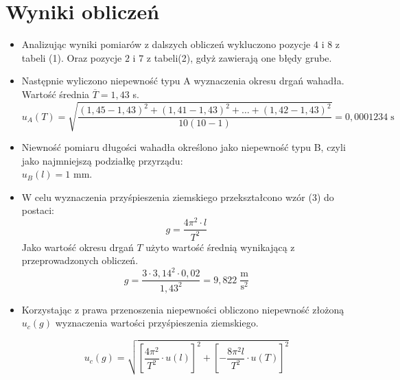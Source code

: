 \documentclass{article}
\theoremstyle{plain}
\begin{document}

\section{Wyniki obliczeń}
	\begin{itemize}
		\item Analizując wyniki pomiarów z dalszych obliczeń wykluczono pozycje $4$ i $8$ z tabeli (1). Oraz pozycje $2$ i $7$ z tabeli(2), gdyż zawierają one błędy grube. %
		
		\item Następnie wyliczono niepewność typu A wyznaczenia okresu drgań wahadła.\\
			Wartość średnia $\overline{T} = 1,43$ s. %
			\begin{equation*}
				u_A(T) = \sqrt{ \frac{(1,45 - 1,43)^2 + (1,41 - 1,43)^2 + \dots + (1,42 - 1,43)^2 }{ 10(10-1) } } = 0,0001234 \; \text{s}
			\end{equation*}
	
		\item Niewność pomiaru długości wahadła określono jako niepewność typu B, czyli jako najmniejszą podziałkę przyrządu: \\ %
			$u_B(l) = 1$ mm. %
			
		\item W celu wyznaczenia przyśpieszenia ziemskiego przekształcono wzór (3) do postaci:
			\begin{equation}
				g = \frac{4\pi^2\cdot l}{T^2}
			\end{equation}
			Jako wartość okresu drgań $T$ użyto wartość średnią wynikającą z przeprowadzonych obliczeń. 
			\begin{equation*}
				g = \frac{3\cdot 3,14^2 \cdot 0,02}{1,43^2} = 9,822 \; \frac{\text{m}}{\text{s}^2}
			\end{equation*}
		
		\item Korzystając z prawa przenoszenia niepewności obliczono niepewność złożoną $u_c(g)$ wyznaczenia wartości przyśpieszenia ziemskiego.
			
			\begin{equation*}
				u_c(g) = \sqrt{ \left[ \frac{4\pi^2}{T^2}\cdot u(l) \right]^2 + \left[ -\frac{8\pi^2 l}{T^2} \cdot u(T) \right]^2 }	
			\end{equation*}


	\end{itemize}
\end{document}
